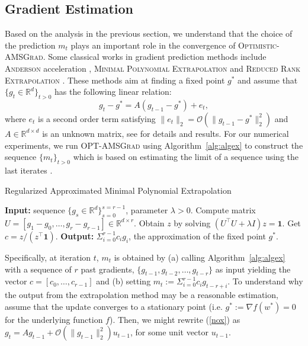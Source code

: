 \documentclass[twoside]{article}
\begin{document}
\subsection{Gradient Estimation}

Based on the analysis in the previous section, we understand that the choice of the prediction $m_t$ plays an important role in the convergence of \textsc{Optimistic-AMSGrad}.
Some classical works in gradient prediction methods include \textsc{Anderson} acceleration \citep{WN11}, \textsc{Minimal Polynomial Extrapolation} \citep{CJ76} and  \textsc{Reduced Rank Extrapolation} \citep{E79}.
These methods aim at finding a fixed point $g^{*}$ and assume that $\{g_t \in \mathbb R^d\}_{t>0} $ has the following linear relation:
\begin{equation} \label{nox}
g_t - g^* = A( g_{t-1} - g^* ) + e_t,
\end{equation}
where $e_t$ is a second order term satisfying $\| e_t \|_2  = \mathcal{O}( \| g_{t-1} - g^* \|_2^2)$ and $A \in \mathbb R^{d \times d}$ is an unknown matrix, see \citep{SAB16} for details and results.
For our numerical experiments, we run \textsc{OPT-AMSGrad} using Algorithm~\ref{alg:algex} to construct the sequence $\{m_t\}_{t>0}$ which is based on estimating the limit of a sequence using the last iterates \citep{BZ13}.
\begin{algorithm}[H]
\begin{algorithmic}[1] 
\small
\caption{Regularized Approximated Minimal Polynomial Extrapolation \citep{SAB16} } \label{alg:algex}
\STATE \textbf{Input:} sequence $\{ g_s \in \mathbb R^d \}_{s=0}^{s=r-1}$, parameter $\lambda > 0$.
\STATE Compute matrix  $U = [ g_1 - g_0, \dots, g_{r} - g_{r-1}] \in \mathbb R^{d \times r}$.
\STATE Obtain $z$ by solving $(U^\top U + \lambda I ) z = \mathbf{1}$.
\STATE Get $c= z / (z^\top \mathbf{1})$.
\STATE \textbf{Output:} $\Sigma_{i=0}^{r-1} c_i g_i$, the approximation of the fixed point $g^*$.
\end{algorithmic}
\end{algorithm}
Specifically, at iteration $t$, $m_t$ is obtained by \textsf{(a)} calling Algorithm~\ref{alg:algex} with a sequence of $r$ past gradients, $\{ g_{t-1},g_{t-2}, \dots, g_{t-r} \}$ as input yielding the vector $c = [c_0, \dots, c_{r-1}] $ and \textsf{(b)} setting $m_t:= \Sigma_{i=0}^{r-1} c_i g_{t-r+i}$.
To understand why the output from the extrapolation method may be a reasonable estimation, assume that the update converges to a stationary point (i.e. $g^*:=\nabla f(w^*) = 0$ for the underlying function $f$). Then, we might rewrite (\ref{nox}) as $g_t = A g_{t-1}  + \mathcal{O}( \| g_{t-1} \|_2^2 ) u_{t-1}$, for some unit vector $u_{t-1}$.
\end{document}
